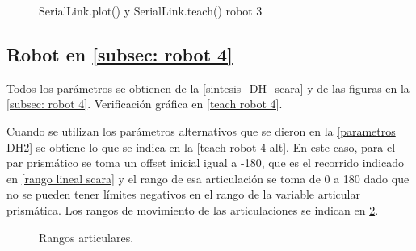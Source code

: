 \documentclass[a4paper,12pt]{article}
\begin{document}
\begin{figure}[htpb]
    \centering
    \begin{adjustbox}{scale = 0.9, max width=\columnwidth}
    \end{adjustbox}
    \caption{SerialLink.plot() y SerialLink.teach() robot 3}
    \label{teach robot 3}
\end{figure}

\subsection{Robot en \cref{subsec: robot 4}}
Todos los parámetros se obtienen de la \cref{sintesis_DH_scara}
y de las figuras en la \cref{subsec: robot 4}. Verificación gráfica en \cref{teach robot 4}.

Cuando se utilizan los parámetros alternativos que se dieron en la \cref{parametros DH2}
se obtiene lo que se indica en la \cref{teach robot 4 alt}.
En este caso, para el par prismático se toma un offset inicial igual a -180, que es el recorrido indicado en
\cref{rango lineal scara} y el rango de esa articulación se toma de 0 a 180 dado que no se pueden tener límites negativos en el rango de la variable articular prismática.
Los rangos de movimiento de las articulaciones se indican en \cref{rangos scara}.


\begin{figure}[htpb]
    \centering
    \begin{adjustbox}{max width=\columnwidth}
    \end{adjustbox}
    \caption{Rangos articulares.}
    \label{rangos scara}
\end{figure}
\end{document}
